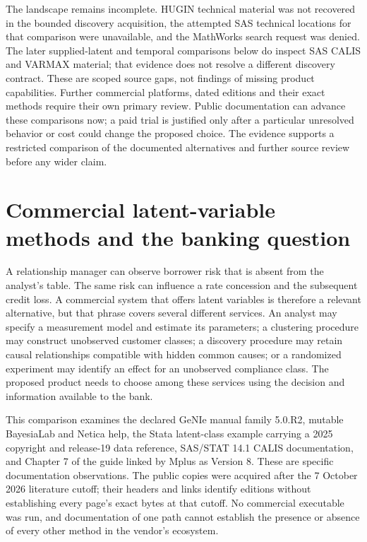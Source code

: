 The landscape remains incomplete. HUGIN technical material was not recovered
in the bounded discovery acquisition, the attempted SAS technical locations
for that comparison were unavailable, and the MathWorks search request was
denied. The later supplied-latent and temporal comparisons below do inspect
SAS CALIS and VARMAX material; that evidence does not resolve a different
discovery contract. These are scoped source gaps, not findings of missing
product capabilities. Further commercial
platforms, dated editions and their exact methods require their own primary
review. Public documentation can advance these comparisons now; a paid
trial is justified only after a particular unresolved behavior or cost could
change the proposed choice. The evidence supports a restricted comparison
of the documented alternatives and further source review before any wider claim.
\label{exec13:commercial-end}


\hypertarget{commercial-latent-variable-methods-and-the-banking-question}{%
\section{Commercial latent-variable methods and the banking
question}\label{commercial-latent-variable-methods-and-the-banking-question}}

\label{exec13:latent-commercial}

A relationship manager can observe borrower risk that is absent from the
analyst's table. The same risk can influence a rate concession and the
subsequent credit loss. A commercial system that offers latent variables
is therefore a relevant alternative, but that phrase covers several
different services. An analyst may specify a measurement model and
estimate its parameters; a clustering procedure may construct unobserved
customer classes; a discovery procedure may retain causal relationships
compatible with hidden common causes; or a randomized experiment may
identify an effect for an unobserved compliance class. The proposed
product needs to choose among these services using the decision and
information available to the bank.

This comparison examines the declared GeNIe manual family 5.0.R2,
mutable BayesiaLab and Netica help, the Stata latent-class example
carrying a 2025 copyright and release-19 data reference, SAS/STAT 14.1
CALIS documentation, and Chapter 7 of the guide linked by Mplus as
Version 8. These are specific documentation observations. The public
copies were acquired after the 7 October 2026 literature cutoff; their
headers and links identify editions without establishing every page's
exact bytes at that cutoff. No commercial executable was run, and
documentation of one path cannot establish the presence or absence of
every other method in the vendor's ecosystem.
\citep{exec13_genie_readme,exec13_latent_genie_parameters,
exec13_latent_bayesia_data,exec13_latent_netica_structure,
exec13_latent_stata_lca,exec13_latent_sas_calis,exec13_latent_mplus}

